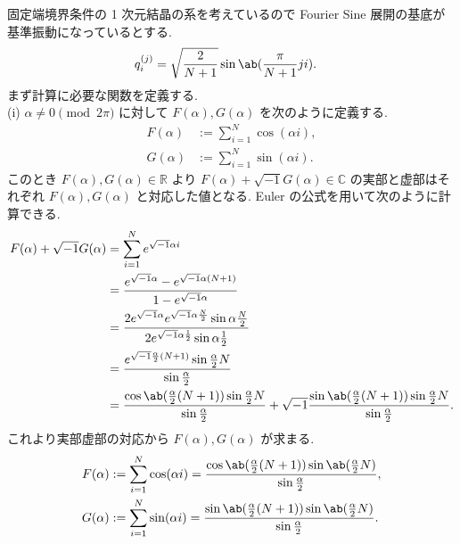 \documentclass[uplatex,dvipdfmx,a4paper,11pt]{jlreq}
\newcommand{\CC}{\mathbb{C}}
\newcommand{\RR}{\mathbb{R}}
\numberwithin{equation}{section}
\theoremstyle{definition}
\begin{document}
固定端境界条件の 1 次元結晶の系を考えているので Fourier Sine 展開の基底が基準振動になっているとする.
\begin{align}
  q_i^{(j)} & = \sqrt{\frac{2}{N+1}}\sin\ab(\frac{\pi}{N+1}ji).
\end{align}
まず計算に必要な関数を定義する. \\

(i) $\alpha \neq 0 \pmod{2\pi}$ に対して $F(\alpha), G(\alpha)$ を次のように定義する.
\begin{align}
  F(\alpha) & := \sum_{i=1}^{N}\cos(\alpha i), \\
  G(\alpha) & := \sum_{i=1}^{N}\sin(\alpha i).
\end{align}
このとき $F(\alpha), G(\alpha)\in\RR$ より $F(\alpha) + \sqrt{-1}G(\alpha)\in\CC$ の実部と虚部はそれぞれ $F(\alpha), G(\alpha)$ と対応した値となる. Euler の公式を用いて次のように計算できる.
\begin{align}
  F(\alpha) + \sqrt{-1}G(\alpha) & = \sum_{i=1}^{N}e^{\sqrt{-1}\alpha i}                                                                                                                                                   \\
                                 & = \frac{e^{\sqrt{-1}\alpha} - e^{\sqrt{-1}\alpha (N+1)}}{1 - e^{\sqrt{-1}\alpha}}                                                                                                       \\
                                 & = \frac{2e^{\sqrt{-1}\alpha}e^{\sqrt{-1}\alpha \frac{N}{2}}\sin{\alpha \frac{N}{2}}}{2e^{\sqrt{-1}\alpha\frac{1}{2}}\sin{\alpha\frac{1}{2}}}                                            \\
                                 & = \frac{e^{\sqrt{-1}\frac{\alpha}{2}(N+1)}\sin{\frac{\alpha}{2}N}}{\sin{\frac{\alpha}{2}}}                                                                                              \\
                                 & = \frac{\cos\ab(\frac{\alpha}{2}(N+1))\sin{\frac{\alpha}{2}N}}{\sin{\frac{\alpha}{2}}} + \sqrt{-1}\frac{\sin\ab(\frac{\alpha}{2}(N+1))\sin{\frac{\alpha}{2}N}}{\sin{\frac{\alpha}{2}}}.
\end{align}
これより実部虚部の対応から $F(\alpha), G(\alpha)$ が求まる.
\begin{align}
  F(\alpha) & := \sum_{i=1}^{N}\cos(\alpha i) = \frac{\cos\ab(\frac{\alpha}{2}(N+1))\sin\ab(\frac{\alpha}{2}N)}{\sin{\frac{\alpha}{2}}}, \\
  G(\alpha) & := \sum_{i=1}^{N}\sin(\alpha i) = \frac{\sin\ab(\frac{\alpha}{2}(N+1))\sin\ab(\frac{\alpha}{2}N)}{\sin{\frac{\alpha}{2}}}.
\end{align}
\end{document}
